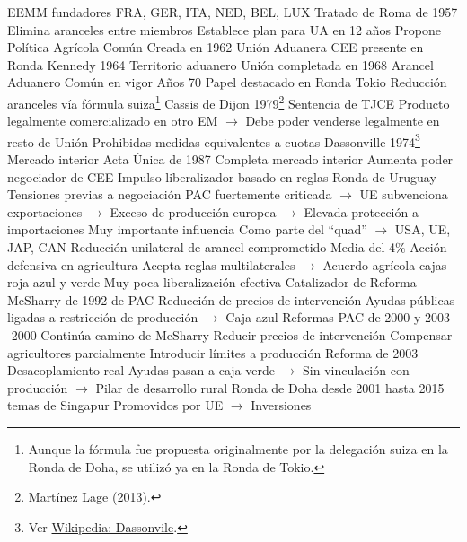 \documentclass{nuevotema}
\begin{document}
\begin{esquemal}
				 EEMM fundadores
				\4[] FRA, GER, ITA, NED, BEL, LUX
			\3 Tratado de Roma de 1957
				\4 Elimina aranceles entre miembros
				\4 Establece plan para UA en 12 años
				\4 Propone Política Agrícola Común
				\4[] Creada en 1962
			\3 Unión Aduanera
				\4 CEE presente en Ronda Kennedy 1964
				\4[] Territorio aduanero
				\4 Unión completada en 1968
				\4 Arancel Aduanero Común en vigor
			\3 Años 70
				\4 Papel destacado en Ronda Tokio
				\4 Reducción aranceles vía fórmula suiza\footnote{Aunque la fórmula fue propuesta originalmente por la delegación suiza en la Ronda de Doha, se utilizó ya en la Ronda de Tokio.}
				\4 Cassis de Dijon 1979\footnote{\href{https://circulodeempresarios.org/2013/01/29/el-cassis-de-dijon-y-la-unidad-del-mercado-nacional/}{Martínez Lage (2013).}}
				\4[] Sentencia de TJCE
				\4[] Producto legalmente comercializado en otro EM
				\4[] $\to$ Debe poder venderse legalmente en resto de Unión
				\4[] Prohibidas medidas equivalentes a cuotas
				\4 Dassonville 1974\footnote{Ver \href{https://en.wikipedia.org/wiki/Procureur\_du\_Roi\_v\_Beno\%C3\%AEt_and_Gustave_Dassonville}{Wikipedia: Dassonvile}.}
			\3 Mercado interior
				\4 Acta Única de 1987
				\4 Completa mercado interior
				\4[$\to$] Aumenta poder negociador de CEE
				\4[$\to$] Impulso liberalizador basado en reglas
			\3 Ronda de Uruguay
				\4 Tensiones previas a negociación
				\4[] PAC fuertemente criticada
				\4[] $\to$ UE subvenciona exportaciones
				\4[] $\to$ Exceso de producción europea
				\4[] $\to$ Elevada protección a importaciones
				\4 Muy importante influencia
				\4[] Como parte del ``quad''
				\4[] $\to$ USA, UE, JAP, CAN
				\4 Reducción unilateral de arancel comprometido
				\4[] Media del 4\%
				\4 Acción defensiva en agricultura
				\4[] Acepta reglas multilaterales
				\4[] $\to$ Acuerdo agrícola cajas roja azul y verde
				\4[] Muy poca liberalización efectiva
				\4 Catalizador de Reforma McSharry de 1992 de PAC
				\4[] Reducción de precios de intervención
				\4[] Ayudas públicas ligadas a restricción de producción
				\4[] $\to$ Caja azul
			\3 Reformas PAC de 2000 y 2003
				-2000
				\4[] Continúa camino de McSharry
				\4[] Reducir precios de intervención
				\4[] Compensar agricultores parcialmente
				\4[] Introducir límites a producción
				\4 Reforma de 2003
				\4[] Desacoplamiento real
				\4[] Ayudas pasan a caja verde
				\4[] $\to$ Sin vinculación con producción
				\4[] $\to$ Pilar de desarrollo rural
			\3 Ronda de Doha desde 2001 hasta 2015
				 temas de Singapur
				\4[] Promovidos por UE
				\4[] $\to$ Inversiones

\end{esquemal}
\end{document}

